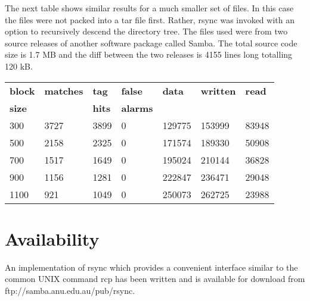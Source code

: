 \documentclass[a4paper]{article}
\begin{document}
The next table shows similar results for a much smaller set of files.
In this case the files were not packed into a tar file first. Rather,
rsync was invoked with an option to recursively descend the directory
tree. The files used were from two source releases of another software
package called Samba. The total source code size is 1.7 MB and the
diff between the two releases is 4155 lines long totalling 120 kB.

\vspace*{5mm}
\begin{tabular}{|l|l|l|l|l|l|l|} \hline
{\bf block} & {\bf matches} & {\bf tag}  & {\bf false}  & {\bf data} & {\bf written}  & {\bf read} \\
{\bf size}  &               & {\bf hits} & {\bf alarms} &            &                &            \\ \hline \hline

300         & 3727          & 3899       & 0            & 129775     & 153999         & 83948       \\ \hline
500         & 2158          & 2325       & 0            & 171574     & 189330         & 50908       \\ \hline
700         & 1517          & 1649       & 0            & 195024     & 210144         & 36828        \\ \hline
900         & 1156          & 1281       & 0            & 222847     & 236471         & 29048        \\ \hline
1100        & 921           & 1049       & 0            & 250073     & 262725         & 23988        \\ \hline
\end{tabular}
\vspace*{5mm}


\section{Availability}

An implementation of rsync which provides a convenient interface
similar to the common UNIX command rcp has been written and is
available for download from ftp://samba.anu.edu.au/pub/rsync.
\end{document}
